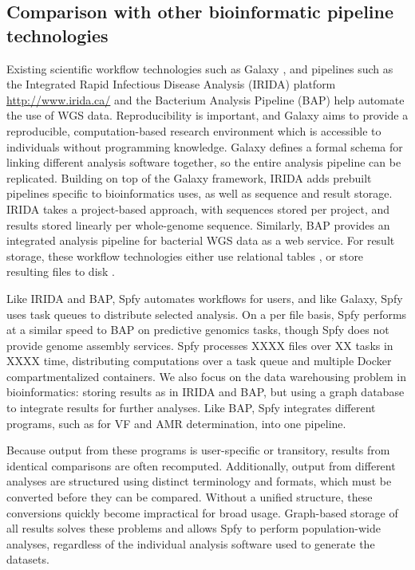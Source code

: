\documentclass{article}
\begin{document}
\subsection{Comparison with other bioinformatic pipeline technologies}

Existing scientific workflow technologies such as Galaxy \cite{goecks2010galaxy}, and pipelines such as the Integrated Rapid Infectious Disease Analysis (IRIDA) platform \url{http://www.irida.ca/} and the Bacterium Analysis Pipeline (BAP) \cite{thomsen2016bacterial} help automate the use of WGS data.
Reproducibility is important, and Galaxy aims to provide a reproducible, computation-based research environment which is accessible to individuals without programming knowledge. Galaxy defines a formal schema for linking different analysis software together, so the entire analysis pipeline can be replicated.
Building on top of the Galaxy framework, IRIDA adds prebuilt pipelines specific to bioinformatics uses, as well as sequence and result storage. IRIDA takes a project-based approach, with sequences stored per project, and results stored linearly per whole-genome sequence. Similarly, BAP provides an integrated analysis pipeline for bacterial WGS data as a web service.
For result storage, these workflow technologies either use relational tables \cite{goecks2010galaxy}, or store resulting files to disk \cite{thomsen2016bacterial}.

Like IRIDA and BAP, Spfy automates workflows for users, and like Galaxy, Spfy uses task queues to distribute selected analysis.
On a per file basis, Spfy performs at a similar speed to BAP on predictive genomics tasks, though Spfy does not provide genome assembly services.
Spfy processes XXXX files over XX tasks in XXXX time, distributing computations over a task queue and multiple Docker compartmentalized containers.
We also focus on the data warehousing problem in bioinformatics: storing results as in IRIDA and BAP, but using a graph database to integrate results for further analyses.
Like BAP, Spfy integrates different programs, such as for VF and AMR determination, into one pipeline. \par

Because output from these programs is user-specific or transitory, results from identical comparisons are often recomputed. Additionally, output from different analyses are structured using distinct terminology and formats, which must be converted before they can be compared. Without a unified structure, these conversions quickly become impractical for broad usage. Graph-based storage of all results solves these problems and allows Spfy to perform population-wide analyses, regardless of the individual analysis software used to generate the datasets.
\end{document}
